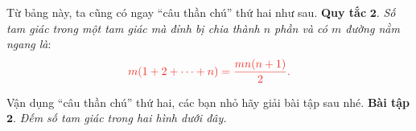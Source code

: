 	Từ bảng này, ta cũng có ngay “câu thần chú” thứ hai như sau.
	\vskip 0.1cm
	\textbf{\color{toancuabi}Quy tắc} $\pmb{2.}$ \textit{Số tam giác trong một tam giác mà đỉnh bị chia thành $n$ phần và có $m$ đường nằm ngang là}:
	\begin{align*}
	\color{toanhocdoisong}m(1+2+\cdots+n) = \frac{mn(n+1)}{2}.
	\end{align*}
	\begin{figure}[H]
		\centering
		\vspace*{-5pt}
		\captionsetup{labelformat= empty, justification=centering}
		\captionsetup[subfigure]{labelformat=empty}
		\hfill{}\hfill
		\hfill
		\hfill
		\vspace*{-5pt}
	\end{figure} 
	Vận dụng “câu thần chú” thứ hai, các bạn nhỏ hãy giải bài tập sau nhé.
	\vskip 0.1cm
	\textbf{\color{toancuabi}Bài tập} $\pmb{2}$. \textit{Đếm số tam giác trong hai hình dưới đây.}
	\begin{figure}[H]
		\centering
		\vspace*{-5pt}
		\captionsetup{labelformat= empty, justification=centering}
		\captionsetup[subfigure]{labelformat=empty}
		\hfill{}
		\hfill
		\hfill
		\vspace*{-10pt}
	\end{figure} 
